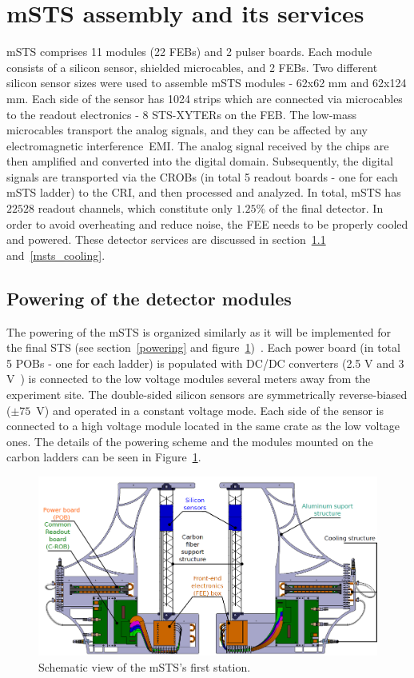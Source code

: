 \section{mSTS assembly and its services}
 \gls{mSTS} comprises 11 modules (22 \glspl{FEB}) and 2 pulser boards. Each module consists of a silicon sensor, shielded microcables, and 2 \glspl{FEB}. Two different silicon sensor sizes were used to assemble \gls{mSTS} modules - 62x62 mm and 62x124 mm. Each side of the sensor has 1024 strips which are connected via microcables to the readout electronics - 8 STS-XYTERs on the \gls{FEB}. The low-mass microcables transport the analog signals, and they can be affected by any electromagnetic interference~\gls{EMI}. The analog signal received by the chips are then amplified and converted into the digital domain. Subsequently, the digital signals are transported via the \glspl{CROB} (in total 5 readout boards - one for each \gls{mSTS} ladder) to the \gls{CRI}, and then processed and analyzed. In total, \gls{mSTS} has $22 528$ readout channels, which constitute only $1.25$\% of the final detector. In order to avoid overheating and reduce noise, the \gls{FEE} needs to be properly cooled and powered. These detector services are discussed in section~\ref{msts_powering} and~\ref{msts_cooling}. 
\subsection{Powering of the detector modules}
\label{msts_powering}
The powering of the \gls{mSTS} is organized similarly as it will be implemented for the final \gls{STS} (see section~\ref{powering} and figure~\ref{fig_msts_scheme})~\cite{Koczon:2020Jc}. Each power board (in total 5 \glspl{POB} - one for each ladder) is populated with DC/DC converters (2.5 V and 3 V~\cite{DC_DC_converter}) is connected to the low voltage modules several meters away from the experiment site. The double-sided silicon sensors are symmetrically reverse-biased ($\pm 75$~V) and operated in a constant voltage mode. Each side of the sensor is connected to a high voltage module located in the same crate as the low voltage ones. The details of the powering scheme and the modules mounted on the carbon ladders can be seen in Figure~\ref{fig_msts_scheme}.

\begin{figure}[!h]
\centering
\includegraphics[width=0.9\columnwidth]{Chapter6/DCS/images/unit0.png}
\caption{Schematic view of the \gls{mSTS}'s first station.}
\label{fig_msts_scheme}
\end{figure}
\newpage
